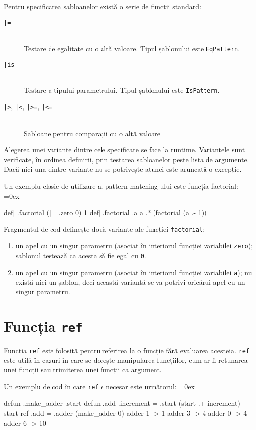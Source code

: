 \documentclass[12pt,a4paper]{memoir}
\renewcommand{\c}{\texttt}
\newenvironment{code}
{
\definecolor{shadecolor}{gray}{0.91}
\topsep=0ex
\relax
\shaded
\verbatim
}
{
\endverbatim
\endshaded
}
\begin{document}
Pentru specificarea șabloanelor există o serie de funcții standard:
\begin{description}
\item[\c{|=}]\hfill\\ Testare de egalitate cu o altă valoare. Tipul șablonului este \c{EqPattern}.
\item[\c{|is}]\hfill\\ Testare a tipului parametrului. Tipul șablonului este \c{IsPattern}.
\item[\c{|>}, \c{|<}, \c{|>=}, \c{|<=}]\hfill\\ Șabloane pentru comparații cu o altă valoare
\end{description}

Alegerea unei variante dintre cele specificate se face la runtime. Variantele sunt verificate, în ordinea definirii, prin testarea șabloanelor peste lista de argumente. Dacă nici una dintre variante nu se potrivește atunci este aruncată o excepție.

Un exemplu clasic de utilizare al pattern-matching-ului este funcția factorial:
\begin{code}
def| .factorial (|= .zero 0) { 1 }
def| .factorial .a { a .* (factorial (a .- 1)) }
\end{code}
Fragmentul de cod definește două variante ale funcției \c{factorial}:
\begin{enumerate}
\item un apel cu un singur parametru (asociat în interiorul funcției variabilei \c{zero}); șablonul testează ca acesta să fie egal cu \c{0}.
\item un apel cu un singur parametru (asociat în interiorul funcției variabilei \c{a}); nu există nici un șablon, deci această variantă se va potrivi oricărui apel cu un singur parametru.
\end{enumerate}

\section{Funcția \c{ref}}

Funcția \c{ref} este folosită pentru referirea la o funcție fără evaluarea acesteia. \c{ref} este utilă în cazuri în care se dorește manipularea funcțiilor, cum ar fi retunarea unei funcții sau trimiterea unei funcții ca argument. 

Un exemplu de cod în care \c{ref} e necesar este următorul:
\begin{code}
defun .make_adder .start {
  defun .add .increment {
    = .start (start .+ increment)
    start
  }
  ref .add
}
= .adder (make_adder 0)
adder 1 -> 1
adder 3 -> 4
adder 0 -> 4
adder 6 -> 10
\end{code}
\end{document}
